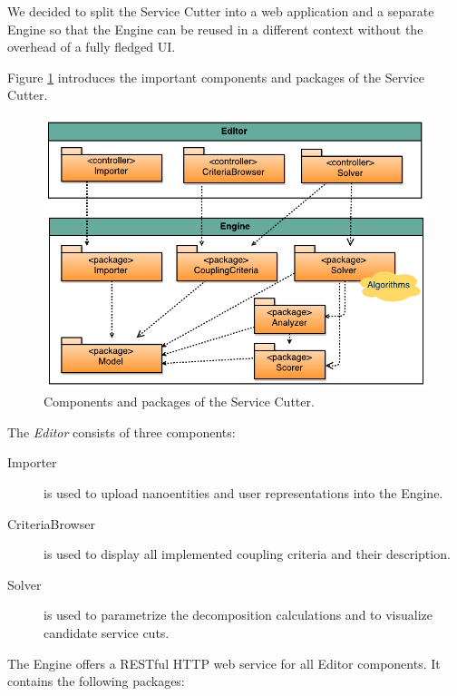 We decided to split the Service Cutter into a web application and a separate Engine so that the Engine can be reused in a different context without the overhead of a fully fledged \gls{UI}.

Figure \ref{fig:packages} introduces the important components and packages of the Service Cutter.

\begin{figure}[H]
	\begin{center}
		\includegraphics[scale=1.1]{diagrams/PackageDiagram.pdf}
		\caption{Components and packages of the Service Cutter.}
		\label{fig:packages}
	\end{center}
\end{figure}

The \textit{Editor} consists of three components:

\begin{description}
	\item[Importer] is used to upload nanoentities and user representations into the Engine.
	\item[CriteriaBrowser] is used to display all implemented coupling criteria and their description.
	\item[Solver] is used to parametrize the decomposition calculations and to visualize candidate service cuts.
\end{description}

The Engine offers a RESTful HTTP web service for all Editor components. It contains the following packages:

